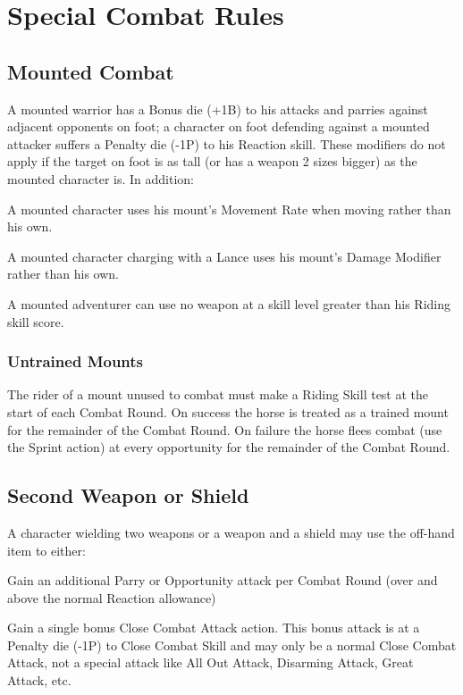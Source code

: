 \section{Special Combat Rules}

\subsection{Mounted Combat}
A mounted warrior has a Bonus die (+1B) to his attacks and parries against adjacent opponents on foot; a character on foot defending against a mounted attacker suffers a Penalty die (-1P) to his Reaction skill. These modifiers do not apply if the target on foot is as tall (or has a weapon 2 sizes bigger) as the mounted character is. In addition:
\begin{rpg-list}
\item A mounted character uses his mount’s Movement Rate when moving rather than his own.
\item A mounted character charging with a Lance uses his mount’s Damage Modifier rather than his own.
\item A mounted adventurer can use no weapon at a skill level greater than his Riding skill score. 
\end{rpg-list}

\subsubsection{Untrained Mounts}
The rider of a mount unused to combat must make a Riding Skill test at the start of each Combat Round.
On success the horse is treated as a trained mount for the remainder of the Combat Round. 
On failure the horse flees combat (use the Sprint action) at every opportunity for the remainder of the Combat Round. 

\subsection{Second Weapon or Shield}
A character wielding two weapons or a weapon and a shield may use the off-hand item to either: 
\begin{rpg-list}
\item Gain an additional Parry or Opportunity attack per Combat Round (over and above the normal Reaction allowance)
\item Gain a single bonus Close Combat Attack action. This bonus attack is at a Penalty die (-1P) to Close Combat Skill and may only be a normal Close Combat Attack, not a special attack like All Out Attack, Disarming Attack, Great Attack, etc.
\end{rpg-list}

